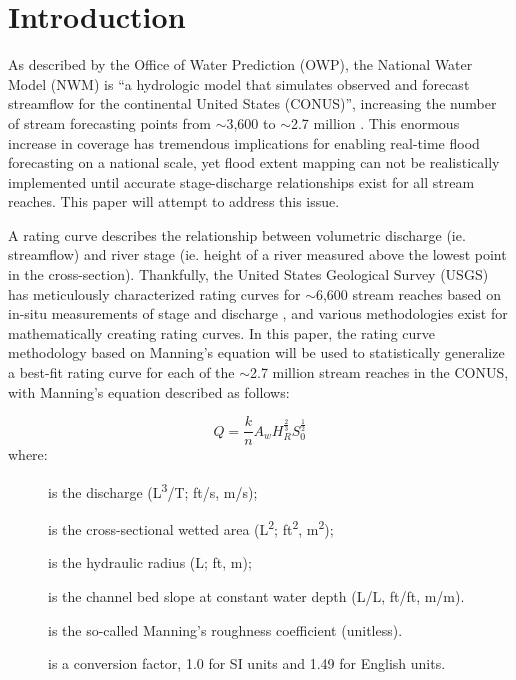 \documentclass[11pt]{article}
\title{\vspace*{-0.25in}{\bfseries\LARGE A Statistical Optimization of Hydraulic Properties for Improved Real-Time Flood Inundation Mapping}}
\author{{\textit{\large Paul Ruess}}}
\date{\vspace{-11pt}}
\begin{document}
\maketitle

\section*{Introduction} %
As described by the Office of Water Prediction (OWP), the National Water Model (NWM) is ``a hydrologic model that simulates observed and forecast streamflow for the continental United States (CONUS)'', increasing the number of stream forecasting points from $\sim$3,600 to $\sim$2.7 million \cite{nwmsummary}. This enormous increase in coverage has tremendous implications for enabling real-time flood forecasting on a national scale, yet flood extent mapping can not be realistically implemented until accurate stage-discharge relationships exist for all stream reaches. This paper will attempt to address this issue. 

A rating curve describes the relationship between volumetric discharge (ie. streamflow) and river stage (ie. height of a river measured above the lowest point in the cross-section). Thankfully, the United States Geological Survey (USGS) has meticulously characterized rating curves for $\sim$6,600 stream reaches based on in-situ measurements of stage and discharge \cite{usgswaterwatch}, and various methodologies exist for mathematically creating rating curves. In this paper, the rating curve methodology based on Manning's equation will be used to statistically generalize a best-fit rating curve for each of the $\sim$2.7 million stream reaches in the CONUS, with Manning's equation described as follows:

\begin{equation}
Q = \frac{k}{n}A_wH_R^\frac{2}{3}S_0^\frac{1}{2}
\end{equation}
where: 
\begin{description}
  \item[] is the discharge (L\textsuperscript{3}/T; ft/s, m/s);
  \item[] is the cross-sectional wetted area (L\textsuperscript{2}; ft\textsuperscript{2}, m\textsuperscript{2});
  \item[] is the hydraulic radius (L; ft, m);
  \item[] is the channel bed slope at constant water depth (L/L, ft/ft, m/m).
  \item[] is the so-called Manning's roughness coefficient (unitless). 
  \item[] is a conversion factor, 1.0 for SI units and 1.49 for English units.
\end{description}
\end{document}
